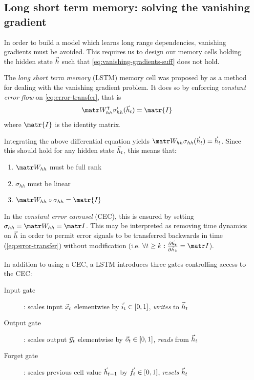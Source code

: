 \subsection{Long short term memory: solving the vanishing gradient}


In order to build a model which learns long range dependencies, vanishing
gradients must be avoided. This requires us to design our memory cells holding
the hidden state $\vec{h}$ such that \cref{eq:vanishing-gradients-suff} does
not hold.

The \emph{long short term memory} (LSTM) memory cell was proposed by
\citet{hochreiter1997long} as a method for dealing with the vanishing gradient
problem. It does so by enforcing \emph{constant error flow} on
\cref{eq:error-transfer}, that is
\begin{equation}
    \W_{hh}^\tp \sigma_{hh}' (\h_{t}) = \matr{I}
\end{equation}
where $\matr{I}$ is the identity matrix.

Integrating the above differential equation yields $\W_{hh} \sigma_{hh}(\h_{t}) = \h_{t}$.
Since this should hold for any hidden state $\vec{h}_{t}$, this means that:
\begin{enumerate}
    \item $\W_{hh}$ must be full rank
    \item $\sigma_{hh}$ must be linear
    \item $\W_{hh} \circ \sigma_{hh} = \matr{I}$
\end{enumerate}

In the \emph{constant error carousel} (CEC), this is ensured by setting
$\sigma_{hh} = \W_{hh} = \I$. This may be interpreted as removing time dynamics
on $\vec{h}$ in order to permit error signals to be transferred backwards in time
(\cref{eq:error-transfer}) without modification (i.e. $\forall t \geq k: \frac{\pd
\h_t}{\pd \h_k} = \I$).

In addition to using a CEC, a LSTM introduces three gates controlling access to the CEC:
\begin{description}
  \item[Input gate]: scales input $\vec{x}_t$ elementwise by $\vec{i}_t \in [0,1]$, \emph{writes} to $\vec{h}_t$
  \item[Output gate]: scales output $\vec{y}_t$ elementwise by $\vec{o}_t \in [0,1]$, \emph{reads} from $\vec{h}_t$
  \item[Forget gate]: scales previous cell value $\vec{h}_{t-1}$ by $\vec{f}_t \in [0,1]$, \emph{resets} $\vec{h}_t$
\end{description}

